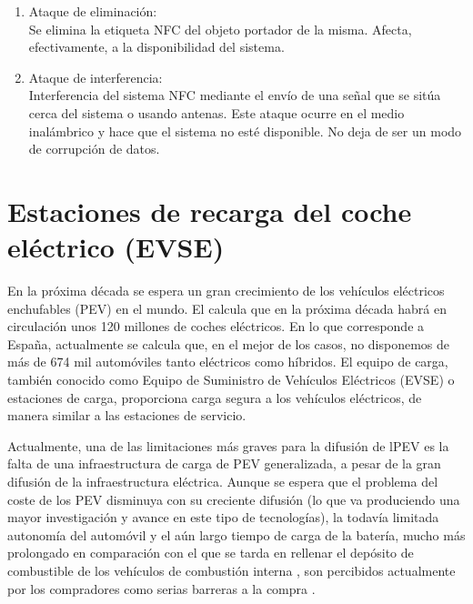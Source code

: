 \documentclass[12pt,a4paper,onecolumn,oneside]{report}
\begin{document}
\begin{enumerate}
\begin{enumerate}
\item Ataque de eliminación:\\
Se elimina la etiqueta NFC del objeto portador de la misma. Afecta, efectivamente, a la disponibilidad del sistema.

\item Ataque de interferencia:\\
Interferencia del sistema NFC mediante el envío de una señal que se sitúa cerca del sistema o usando antenas. Este ataque ocurre en el medio inalámbrico y hace que el sistema no esté disponible. No deja de ser un modo de corrupción de datos.

\end{enumerate}


\end{enumerate}





\chapter{Estaciones de recarga del coche eléctrico (EVSE)}
\label{Estaciones de recarga del coche eléctrico (EVSE)}

En la próxima década se espera un gran crecimiento de los vehículos eléctricos enchufables (PEV) en el mundo. El calcula que en la próxima década habrá en circulación unos 120 millones de coches eléctricos. En lo que corresponde a España, actualmente se calcula que, en el mejor de los casos, no disponemos de más de 674 mil automóviles tanto eléctricos como híbridos. El equipo de carga, también conocido como Equipo de Suministro de Vehículos Eléctricos (EVSE) o estaciones de carga, proporciona carga segura a los vehículos eléctricos, de manera similar a las estaciones de servicio. 

Actualmente, una de las limitaciones más graves para la difusión de lPEV es la falta de una infraestructura de carga de PEV generalizada, a pesar de la gran difusión de la infraestructura eléctrica. Aunque se espera que el problema del coste de los PEV disminuya con su creciente difusión (lo que va produciendo una mayor investigación y avance en este tipo de tecnologías), la todavía limitada autonomía del automóvil y el aún largo tiempo de carga de la batería, mucho más prolongado en comparación con el que se tarda en rellenar el depósito de combustible de los vehículos de combustión interna \cite{diezuno}, son percibidos actualmente por los compradores como serias barreras a la compra \cite{diezdos}\cite{dieztres}.
\end{document}
